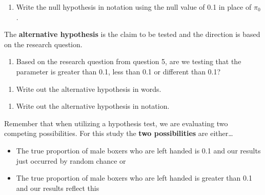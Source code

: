 \documentclass[
]{report}
\providecommand{\tightlist}{%
  \setlength{\itemsep}{0pt}\setlength{\parskip}{0pt}}
\begin{document}
\begin{enumerate}
\def\labelenumi{\arabic{enumi}.}
\setcounter{enumi}{10}
\tightlist
\item
  Write the null hypothesis in notation using the null value of 0.1 in place of \(\pi_0\).
\end{enumerate}

\vspace{0.5in}

The \textbf{alternative hypothesis} is the claim to be tested and the direction is based on the research question.

\begin{enumerate}
\def\labelenumi{\arabic{enumi}.}
\setcounter{enumi}{11}
\tightlist
\item
  Based on the research question from question 5, are we testing that the parameter is greater than 0.1, less than 0.1 or different than 0.1?
\end{enumerate}

\vspace{0.5in}

\begin{enumerate}
\def\labelenumi{\arabic{enumi}.}
\setcounter{enumi}{12}
\tightlist
\item
  Write out the alternative hypothesis in words.
\end{enumerate}

\vspace{1in}

\begin{enumerate}
\def\labelenumi{\arabic{enumi}.}
\setcounter{enumi}{13}
\tightlist
\item
  Write out the alternative hypothesis in notation.
\end{enumerate}

\vspace{0.5in}

Remember that when utilizing a hypothesis test, we are evaluating two competing possibilities. For this study the \textbf{two possibilities} are either\ldots{}

\begin{itemize}
\item
  The true proportion of male boxers who are left handed is 0.1 and our results just occurred by random chance or
\item
  The true proportion of male boxers who are left handed is greater than 0.1 and our results reflect this
\end{itemize}
\end{document}
